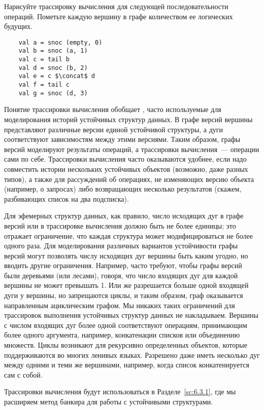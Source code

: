 \begin{exercise}\label{ex:6.1}
  Нарисуйте трассировку вычисления для следующей последовательности
  операций. Пометьте каждую вершину в графе количеством ее логических
  будущих.
  \begin{lstlisting}
    val a = snoc (empty, 0)
    val b = snoc (a, 1)
    val c = tail b
    val d = snoc (b, 2)
    val e = c $\concat$ d
    val f = tail c
    val g = snoc (d, 3)
  \end{lstlisting}
\end{exercise}
Понятие трассировки вычисления обобщает  \cite{Driscoll-etal1989}, часто используемые для
моделирования историй устойчивых структур данных. В графе версий
вершины представляют различные версии единой устойчивой структуры, а
дуги соответствуют зависимостям между этими версиями.  Таким образом,
графы версий моделируют результаты операций, а трассировки
вычисления~--- операции сами по себе. Трассировки вычисления часто
оказываются удобнее, если надо совместить истории нескольких
устойчивых объектов (возможно, даже разных типов), а также для
рассуждений об операциях, не изменяющих версию объекта (например, о
запросах) либо возвращающих несколько результатов (скажем, разбивающих
список на два подсписка).

Для эфемерных структур данных, как правило, число исходящих дуг в
графе версий или в трассировке вычисления должно быть не более
единицы; это отражает ограничение, что каждая структура может
модифицироваться не более одного раза.  Для моделирования различных
вариантов устойчивости графы версий могут позволять числу исходящих
дуг вершины быть каким угодно, но вводить другие
ограничения. Например, часто требуют, чтобы графы версий были
деревьями (или лесами), говоря, что число входящих дуг для каждой
вершины не может превышать 1. Или же разрешается больше одной входящей
дуги у вершины, но запрещаются циклы, и таким образом, граф
оказывается направленным ациклическим графом. Мы никаких таких
ограничений для трассировок выполнения устойчивых структур данных не
накладываем. Вершины с числом входящих дуг более одной соответствуют
операциям, принимающим более одного аргумента, например, конкатенации
списков или объединению множеств. Циклы возникают для рекурсивно
определенных объектов, которые поддерживаются во многих ленивых
языках. Разрешено даже иметь несколько дуг между одними и теми же
вершинами, например, когда список конкатенируется сам с собой.

Трассировки вычисления будут использоваться в Разделе~\ref{sc:6.3.1},
где мы расширяем метод банкира для работы с устойчивыми структурами.


